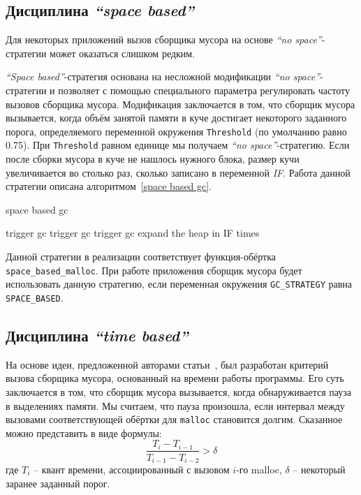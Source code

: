 \subsection{Дисциплина \emph{``space based''}}
Для некоторых приложений вызов сборщика мусора на основе \emph{``no space''}-стратегии
может оказаться слишком редким. 

\emph{``Space based''}-стратегия основана на несложной модификации 
\emph{``no space''}-стратегии и позволяет с помощью специального параметра 
регулировать частоту вызовов сборщика мусора.
Модификация заключается в том, что сборщик мусора вызывается, когда
объём занятой памяти в куче достигает некоторого 
заданного порога, определяемого переменной окружения  \texttt{Threshold} (по умолчанию
равно 0.75). При \texttt{Threshold} равном единице мы получаем \emph{``no space''}-стратегию.
Если после сборки мусора в куче не нашлось нужного блока, размер кучи
увеличивается во столько раз, сколько записано в переменной \emph{IF}.
Работа данной стратегии описана алгоритмом~\ref{space based gc}.

\begin{algorithm}[hbt]
\caption{space based gc}
\label{space based gc}
\begin{algorithmic}[4]

    \State trigger gc
\EndIf
{}
        \State trigger gc
\EndIf
{}
            \State trigger gc
\EndIf
{}
    \State expand the heap in IF times
\EndIf 
\end{algorithmic}
\end{algorithm}


Данной стратегии в реализации соответствует функция-обёртка \texttt{space\_based\_malloc}.
При работе приложения сборщик мусора будет использовать данную стратегию,
если переменная окружения \texttt{GC\_STRATEGY} равна \texttt{SPACE\_BASED}.


\subsection{Дисциплина \emph{``time based''}}

На основе идеи, предложенной авторами статьи~\cite{microphase}, был разработан критерий
вызова сборщика мусора, основанный на времени работы программы. Его суть заключается
в том, что сборщик мусора вызывается, когда обнаруживается пауза в выделениях памяти.
Мы считаем, что пауза произошла, если интервал между вызовами соответствующей обёртки для \texttt{malloc}
становится долгим. Сказанное можно представить в виде формулы:
    $$\frac {T_i - T_{i-1}} {T_{i-1} - T_{i-2}} > \delta $$ 
    где $T_{i}$ -- квант времени, ассоциированный с вызовом $i$-го malloc, $\delta$ -- некоторый 
    заранее заданный порог.


